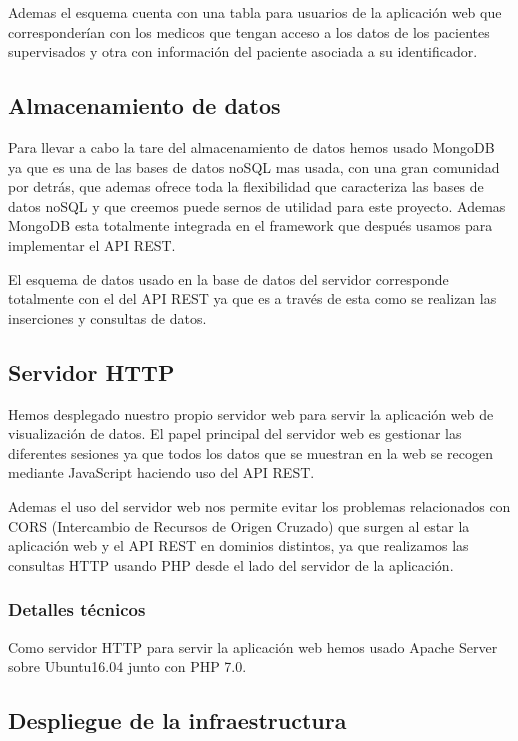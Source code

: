 \documentclass[11pt,spanish]{article}
\begin{document}
Ademas el esquema cuenta con una tabla para usuarios de la aplicación web que corresponderían con los medicos que tengan acceso a los datos de los pacientes supervisados y otra con información del paciente asociada a su identificador.
\newline

\subsection{Almacenamiento de datos}
Para llevar a cabo la tare del almacenamiento de datos hemos usado MongoDB ya que es una de las bases de datos noSQL mas usada, con una gran comunidad por detrás, que ademas ofrece toda la flexibilidad que caracteriza las bases de datos noSQL y que creemos puede sernos de utilidad para este proyecto. Ademas MongoDB esta totalmente integrada en el framework que después usamos para implementar el API REST.

El esquema de datos usado en la base de datos del servidor corresponde totalmente con el del API REST ya que es a través de esta como se realizan las inserciones y consultas de datos.

\subsection{Servidor HTTP}
Hemos desplegado nuestro propio servidor web para servir la aplicación web de visualización de datos. El papel principal del servidor web es gestionar las diferentes sesiones ya que todos los datos que se muestran en la web se recogen mediante JavaScript haciendo uso del API REST. 
\newline

Ademas el uso del servidor web nos permite evitar los problemas relacionados con CORS (Intercambio de Recursos de Origen Cruzado) que surgen al estar la aplicación web y el API REST en dominios distintos, ya que realizamos las consultas HTTP usando PHP desde el lado del servidor de la aplicación.

\subsubsection{Detalles técnicos}
Como servidor HTTP para servir la aplicación web hemos usado Apache Server sobre Ubuntu16.04 junto con PHP 7.0.

\subsection{Despliegue de la infraestructura}
\end{document}
